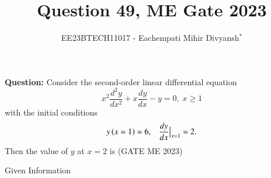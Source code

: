 \documentclass[journal,12pt,twocolumn]{IEEEtran}
\theoremstyle{remark}
\begin{document}

\vspace{3cm}

\title{Question 49, ME Gate 2023}
\author{EE23BTECH11017 - Eachempati Mihir Divyansh$^{*}$}
\maketitle
\newpage
\bigskip

\renewcommand{\thefigure}{\theenumi}
\renewcommand{\thetable}{\theenumi}
\textbf{Question:} Consider the second-order linear differential equation
\[x^2\frac{d^2y}{dx^2}+x\frac{dy}{dx}-y=0, \; x\geq 1\]
with the initial conditions $$y\left(x=1\right)=6,\; \;\; \frac{dy}{dx}\big{|}_{x=1}=2.$$
Then the value of $y$ at $x=2$ is {\hfill(GATE ME 2023)}\\

\solution
\begin{table}[h!]
    \centering
    
    \caption{Given Information} \label{gateME49.tab:1}
\end{table}
\end{document}
